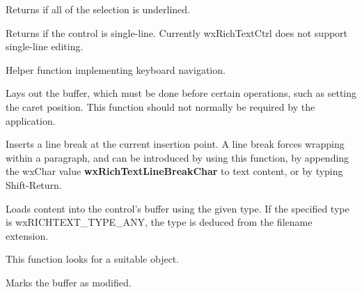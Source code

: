 Returns \true if all of the selection is underlined.

\label{wxrichtextctrlissingleline}


Returns \true if the control is single-line. Currently wxRichTextCtrl does not
support single-line editing.

\label{wxrichtextctrlkeyboardnavigate}


Helper function implementing keyboard navigation.

\label{wxrichtextctrllayoutcontent}


Lays out the buffer, which must be done before certain operations, such as
setting the caret position. This function should not normally be required by the
application.

\label{wxrichtextctrllinebreak}


Inserts a line break at the current insertion point. A line break forces wrapping within a paragraph, and
can be introduced by using this function, by appending the wxChar value {\bf wxRichTextLineBreakChar} to text content,
or by typing Shift-Return.

\label{wxrichtextctrlloadfile}


Loads content into the control's buffer using the given type. If the specified type
is wxRICHTEXT\_TYPE\_ANY, the type is deduced from the filename extension.

This function looks for a suitable  object.

\label{wxrichtextctrlmarkdirty}


Marks the buffer as modified.

\label{wxrichtextctrlmovecaret}

